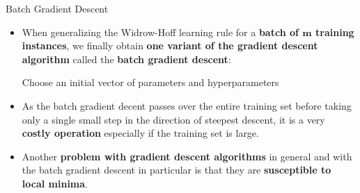 \documentclass[main.tex]{subfiles}
\begin{document}
    \begin{frame}{Batch Gradient Descent}
        \begin{itemize}
            \item When generalizing the Widrow-Hoff learning rule for a \textbf{batch of $\pmb{m}$ training instances}, we finally obtain \textbf{one variant of the gradient descent algorithm} called the \textbf{batch gradient descent}:
            
            \begin{center}
                \begin{minipage}{.85\linewidth}
                    \begin{algorithm}[H]
                        \DontPrintSemicolon
                        \caption{Batch Gradient Descent}
                        Choose an initial vector of parameters and hyperparameters\;
                    \end{algorithm}
                \end{minipage}
            \end{center}
            
            \vspace*{2mm}
            \item As the batch gradient decent passes over the entire training set before taking only a single small step in the direction of steepest descent, it is a very \textbf{costly operation} especially if the training set is large.
            \item Another \textbf{problem with gradient descent algorithms} in general and with the batch gradient descent in particular is that they are \textbf{susceptible to local minima}.
        \end{itemize}
    \end{frame}	
\end{document}
